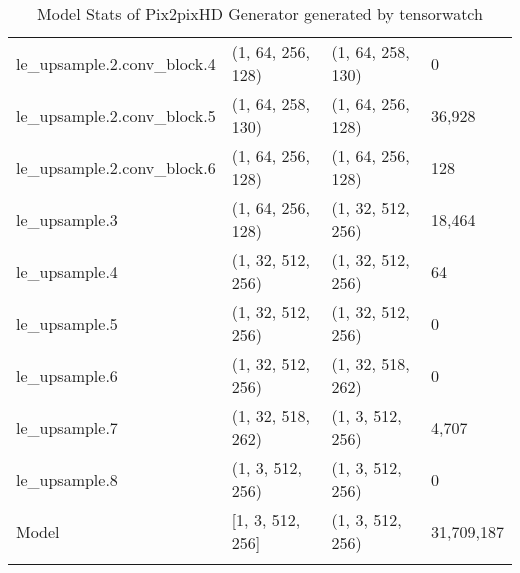 \begin{longtable}{llll}
        le\_upsample.2.conv\_block.4 &  (1, 64, 256, 128) &  (1, 64, 258, 130) &           0 \\
        le\_upsample.2.conv\_block.5 &  (1, 64, 258, 130) &  (1, 64, 256, 128) &      36,928 \\
        le\_upsample.2.conv\_block.6 &  (1, 64, 256, 128) &  (1, 64, 256, 128) &         128 \\
                    le\_upsample.3 &  (1, 64, 256, 128) &  (1, 32, 512, 256) &      18,464 \\
                    le\_upsample.4 &  (1, 32, 512, 256) &  (1, 32, 512, 256) &          64 \\
                    le\_upsample.5 &  (1, 32, 512, 256) &  (1, 32, 512, 256) &           0 \\
                    le\_upsample.6 &  (1, 32, 512, 256) &  (1, 32, 518, 262) &           0 \\
                    le\_upsample.7 &  (1, 32, 518, 262) &   (1, 3, 512, 256) &       4,707 \\
                    le\_upsample.8 &   (1, 3, 512, 256) &   (1, 3, 512, 256) &           0 \\
                            Model &   [1, 3, 512, 256] &   (1, 3, 512, 256) &  31,709,187 \\
    \bottomrule
    \caption{Model Stats of Pix2pixHD Generator generated by tensorwatch}
    \label{Pix2pixHD generator table}
\end{longtable}  
    
